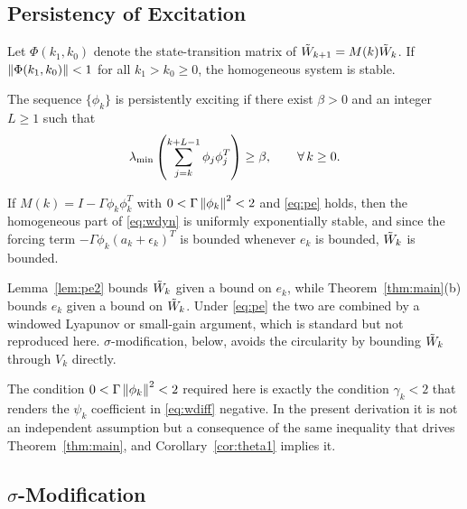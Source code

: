 \subsection{Persistency of Excitation}

\begin{lemma}\label{lem:pe1}
Let $\Phi(k_1,k_0)$ denote the state-transition matrix of
$\tilde{W}_{k+1}=M(k)\tilde{W}_k$. If $\left\lVert \Phi(k_1,k_0) \right\rVert<1$ for all
$k_1>k_0\ge0$, the homogeneous system is stable.
\end{lemma}

\begin{definition}\label{def:pe}
The sequence $\{\phi_k\}$ is persistently exciting if there exist $\beta>0$ and
an integer $L\ge1$ such that
\begin{equation}\label{eq:pe}
\lambda_{\min}\left(\sum_{j=k}^{k+L-1}\phi_j\phi_j^T\right)\ge\beta,\qquad
\forall\,k\ge0 .
\end{equation}
\end{definition}

\begin{lemma}\label{lem:pe2}
If $M(k)=I-\Gamma\phi_k\phi_k^T$ with $0<\Gamma\left\lVert \phi_k \right\rVert^2<2$ and
\eqref{eq:pe} holds, then the homogeneous part of \eqref{eq:wdyn} is uniformly
exponentially stable, and since the forcing term
$-\Gamma\phi_k(a_k+\epsilon_k)^T$ is bounded whenever $e_k$ is bounded, $\tilde{W}_k$
is bounded.
\end{lemma}

Lemma~\ref{lem:pe2} bounds $\tilde{W}_k$ given a bound on $e_k$, while
Theorem~\ref{thm:main}(b) bounds $e_k$ given a bound on $\tilde{W}_k$. Under
\eqref{eq:pe} the two are combined by a windowed Lyapunov or small-gain
argument, which is standard but not reproduced here.
$\sigma$-modification, below, avoids the circularity by bounding $\tilde{W}_k$ through
$V_k$ directly.

The condition $0<\Gamma\left\lVert \phi_k \right\rVert^2<2$ required here is exactly the
condition $\gamma_k<2$ that renders the $\psi_k$ coefficient in \eqref{eq:wdiff}
negative. In the present derivation it is not an independent assumption but a
consequence of the same inequality that drives Theorem~\ref{thm:main}, and
Corollary~\ref{cor:theta1} implies it.

\subsection{\texorpdfstring{$\sigma$}{sigma}-Modification}
\label{sec:sigmod}

